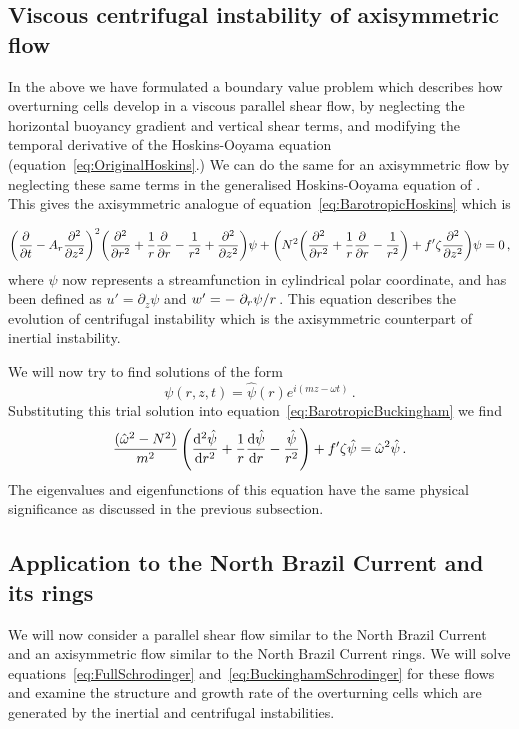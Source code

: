 \subsection{Viscous centrifugal instability of axisymmetric flow}
In the above we have formulated a boundary value problem which describes how overturning cells develop in a viscous parallel shear flow, by neglecting the horizontal buoyancy gradient and vertical shear terms, and modifying the temporal derivative of the Hoskins-Ooyama equation (equation~\ref{eq:OriginalHoskins}.) We can do the same for an axisymmetric flow by neglecting these same terms in the generalised Hoskins-Ooyama equation of \citet{Buckingham2021}. This gives the axisymmetric analogue of equation~\ref{eq:BarotropicHoskins} which is

\begin{equation}
    \label{eq:BarotropicBuckingham}
    \bigg(\pdv{}{t} - A_r \pdv[2]{}{z} \bigg)^2 \bigg(\pdv[2]{}{r} + \frac{1}{r}\pdv{}{r} - \frac{1}{r^2} + \pdv[2]{}{z} \bigg) \psi + \bigg( N^2 \bigg(\pdv[2]{}{r} + \frac{1}{r}\pdv{}{r} - \frac{1}{r^2}\bigg) + f' \zeta \pdv[2]{}{z} \bigg) \psi = 0 \, ,
\end{equation}
where $\psi$ now represents a streamfunction in cylindrical polar coordinate, and has been defined as $u' = \partial_z \psi$ and $w' = - \flatfrac{\partial_r \psi}{r}$. This equation describes the evolution of centrifugal instability which is the axisymmetric counterpart of inertial instability.

We will now try to find solutions of the form
\begin{equation}
    \psi(r, z, t) = \hat{\psi}(r) e^{i(mz - \omega t)} \, .
\end{equation}
Substituting this trial solution into equation~\ref{eq:BarotropicBuckingham} we find
\begin{equation}
    \frac{(\hat{\omega}^2 - N^2 )}{m^2}\, \Bigg(\dv[2]{\hat{\psi}}{r} + \frac{1}{r} \dv{\hat{\psi}}{r} - \frac{\hat{\psi}}{r^2}\Bigg) + f' \zeta \hat{\psi} = \hat{\omega}^2 \hat{\psi}\, .
    \label{eq:BuckinghamSchrodinger}
\end{equation}
The eigenvalues and eigenfunctions of this equation have the same physical significance as discussed in the previous subsection.



\subsection{Application to the North Brazil Current and its rings}
\label{subsec:NBClsa}
We will now consider a parallel shear flow similar to the North Brazil Current and an axisymmetric flow similar to the North Brazil Current rings. We will solve equations~\ref{eq:FullSchrodinger} and~\ref{eq:BuckinghamSchrodinger} for these flows and examine the structure and growth rate of the overturning cells which are generated by the inertial and centrifugal instabilities.

